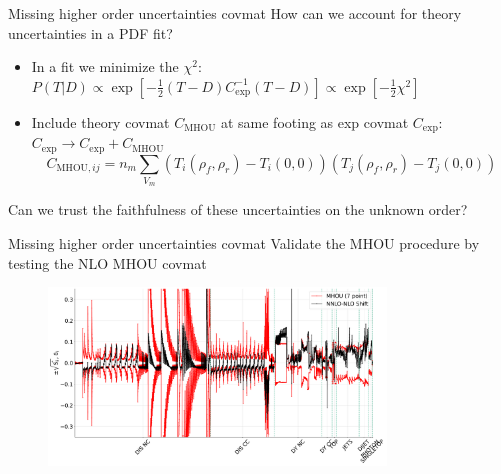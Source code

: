 \documentclass[8pt,t]{beamer}
\begin{document}
\begin{frame}{Missing higher order uncertainties covmat}
  How can we account for theory uncertainties in a PDF fit?

  \vspace*{1em}
  \begin{itemize}
    \item In a fit we minimize the $\chi^2$: \\
    $P(T|D) \propto \exp\left[-\frac{1}{2}\left(T-D\right)C_\mathrm{exp}^{-1}\left(T-D\right)\right] \propto \exp\left[-\frac{1}{2}\chi^2\right]$
    \item Include theory covmat $C_\mathrm{MHOU}$ at same footing as exp covmat $C_\mathrm{exp}$: $C_\mathrm{exp}\rightarrow C_\mathrm{exp}+C_\mathrm{MHOU}$ \\
    $$C_{\mathrm{MHOU},ij} = n_{m}\sum_{V_{m}}\left(T_{i}(\rho_f, \rho_r) - T_{i}(0, 0)\right)\left(T_{j}(\rho_f, \rho_r) - T_{j}(0, 0)\right)$$
  \end{itemize}

  \vspace*{1em}
  \begin{center}
    Can we trust the faithfulness of these uncertainties on the unknown order?
  \end{center}

\end{frame}


\begin{frame}{Missing higher order uncertainties covmat}
  Validate the MHOU procedure by testing the NLO MHOU covmat
  \begin{figure}[!t]
    \centering
      \includegraphics[width=0.8\textwidth]{figures/shift_validation.pdf}
  \end{figure}
\end{frame}
\end{document}

